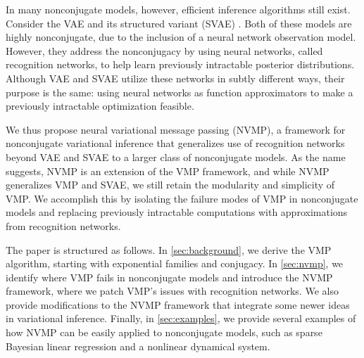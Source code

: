In many nonconjugate models,
however, efficient inference algorithms still exist.
Consider the VAE
and its structured variant (SVAE) \cite{svae}.
Both of these models
are highly nonconjugate, due to the inclusion
of a neural network observation model.
However, they address the nonconjugacy
by using neural networks, called recognition networks,
to help learn previously intractable posterior distributions.
Although VAE and SVAE utilize these networks
in subtly different ways, their purpose is the same: using
neural networks as function approximators
to make a previously intractable optimization feasible.

We thus propose neural variational message passing (NVMP),
a framework for nonconjugate variational inference
that generalizes use of recognition networks beyond
VAE and SVAE to a larger class
of nonconjugate models. 
As the name suggests,
NVMP is an extension of the
VMP framework, and while NVMP
generalizes VMP and SVAE, 
we still retain the modularity and
simplicity of VMP. 
We accomplish this by 
isolating the failure modes of VMP in nonconjugate models
and replacing previously intractable
computations with approximations
from recognition networks.

The paper is structured as follows. In \autoref{sec:background},
we derive the VMP algorithm, starting
with exponential families and conjugacy.
In \autoref{sec:nvmp},
we identify where VMP fails in nonconjugate
models and introduce the NVMP framework,
where we patch VMP's issues
with recognition networks.
We also provide
modifications to the NVMP framework
that integrate some newer ideas
in variational inference. 
Finally, in \autoref{sec:examples},
we provide several examples of how NVMP can
be easily applied to nonconjugate models, such
as sparse Bayesian linear regression
and a nonlinear dynamical system.


